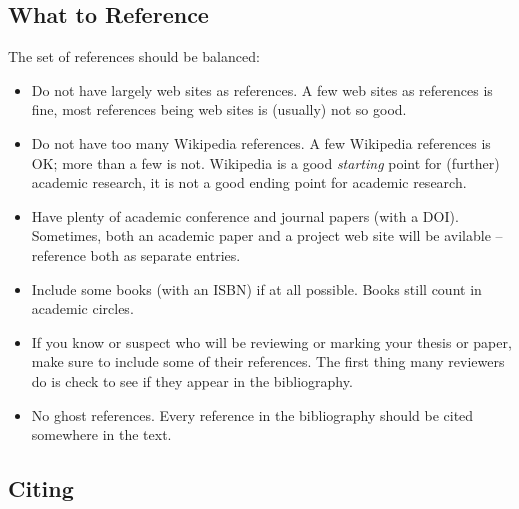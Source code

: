 \subsection{What to Reference}

The set of references should be balanced:
\begin{itemize}
\item Do not have largely web sites as references. A few web sites as
  references is fine, most references being web sites is (usually) not
  so good.

\item Do not have too many Wikipedia references. A few Wikipedia
  references is OK; more than a few is not. Wikipedia is a good
  \emph{starting} point for (further) academic research, it is not a
  good ending point for academic research.

\item Have plenty of academic conference and journal papers (with a
  DOI). Sometimes, both an academic paper and a project web site will
  be avilable -- reference both as separate entries.

\item Include some books (with an ISBN) if at all possible. Books
  still count in academic circles.
 
\item If you know or suspect who will be reviewing or marking your
  thesis or paper, make sure to include some of their references. The
  first thing many reviewers do is check to see if they appear in the
  bibliography.

\item No ghost references. Every reference in the bibliography should
  be cited somewhere in the text.

\end{itemize}





\subsection{Citing}


